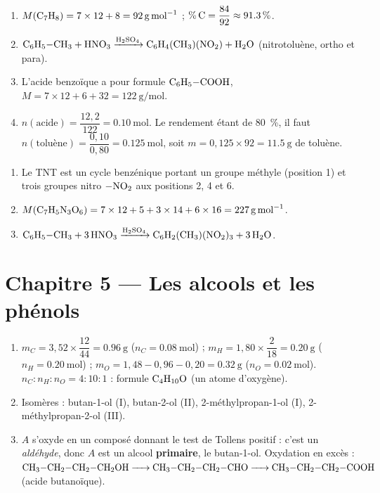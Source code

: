 \begin{enumerate}[label=\arabic*)]
\item $M(\ce{C7H8}) = 7\times12 + 8 = \SI{92}{\gram\per\mol}$ ;
$\%\,\ce{C} = \dfrac{84}{92} \approx \SI{91.3}{\percent}$.
\item $\ce{C6H5-CH3 + HNO3 ->[H2SO4] C6H4(CH3)(NO2) + H2O}$ (nitrotoluène, ortho et para).
\item L'acide benzoïque a pour formule $\ce{C6H5-COOH}$, $M = 7\times12 + 6 + 32 = \SI{122}{\gram\per\mol}$.
\item $n(\text{acide}) = \dfrac{12{,}2}{122} = \SI{0.10}{\mol}$. Le rendement étant de
\SI{80}{\percent}, il faut $n(\text{toluène}) = \dfrac{0{,}10}{0{,}80} = \SI{0.125}{\mol}$,
soit $m = 0{,}125\times92 = \SI{11.5}{\gram}$ de toluène.
\end{enumerate}

\begin{enumerate}[label=\arabic*)]
\item Le TNT est un cycle benzénique portant un groupe méthyle (position 1) et trois
groupes nitro $\ce{-NO2}$ aux positions 2, 4 et 6.
\item $M(\ce{C7H5N3O6}) = 7\times12 + 5 + 3\times14 + 6\times16 = \SI{227}{\gram\per\mol}$.
\item $\ce{C6H5-CH3 + 3 HNO3 ->[H2SO4] C6H2(CH3)(NO2)3 + 3 H2O}$.
\end{enumerate}

\section{Chapitre 5 — Les alcools et les phénols}

\begin{enumerate}[label=\arabic*)]
\item $m_C = 3{,}52\times\dfrac{12}{44} = \SI{0.96}{\gram}$ ($n_C = \SI{0.08}{\mol}$) ;
$m_H = 1{,}80\times\dfrac{2}{18} = \SI{0.20}{\gram}$ ($n_H = \SI{0.20}{\mol}$) ;
$m_O = 1{,}48 - 0{,}96 - 0{,}20 = \SI{0.32}{\gram}$ ($n_O = \SI{0.02}{\mol}$).
$n_C : n_H : n_O = 4 : 10 : 1$ : formule $\ce{C4H10O}$ (un atome d'oxygène).
\item Isomères : butan-1-ol (I), butan-2-ol (II), 2-méthylpropan-1-ol (I),
2-méthylpropan-2-ol (III).
\item $A$ s'oxyde en un composé donnant le test de Tollens positif : c'est un
\emph{aldéhyde}, donc $A$ est un alcool \textbf{primaire}, le butan-1-ol. Oxydation en
excès : $\ce{CH3-CH2-CH2-CH2OH -> CH3-CH2-CH2-CHO -> CH3-CH2-CH2-COOH}$ (acide butanoïque).
\end{enumerate}

